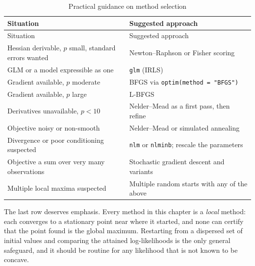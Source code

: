 \documentclass[
  letterpaper,
  DIV=11,
  numbers=noendperiod]{scrreprt}
\newcounter{none} %
\begin{document}
\begin{longtable}[]{@{}
  >{\raggedright\arraybackslash}p{}
  >{\raggedright\arraybackslash}p{}@{}}
\caption{Practical guidance on method
selection}\label{tbl-choosing}\tabularnewline
\toprule\noalign{}
\begin{minipage}[b]{\linewidth}\raggedright
Situation
\end{minipage} & \begin{minipage}[b]{\linewidth}\raggedright
Suggested approach
\end{minipage} \\
\midrule\noalign{}
\endfirsthead
\toprule\noalign{}
\begin{minipage}[b]{\linewidth}\raggedright
Situation
\end{minipage} & \begin{minipage}[b]{\linewidth}\raggedright
Suggested approach
\end{minipage} \\
\midrule\noalign{}
\endhead
\bottomrule\noalign{}
\endlastfoot
Hessian derivable, \(p\) small, standard errors wanted & Newton--Raphson
or Fisher scoring \\
GLM or a model expressible as one & \texttt{glm} (IRLS) \\
Gradient available, \(p\) moderate & BFGS via
\texttt{optim(method\ =\ "BFGS")} \\
Gradient available, \(p\) large & L-BFGS \\
Derivatives unavailable, \(p < 10\) & Nelder--Mead as a first pass, then
refine \\
Objective noisy or non-smooth & Nelder--Mead or simulated annealing \\
Divergence or poor conditioning suspected & \texttt{nlm} or
\texttt{nlminb}; rescale the parameters \\
Objective a sum over very many observations & Stochastic gradient
descent and variants \\
Multiple local maxima suspected & Multiple random starts with any of the
above \\
\end{longtable}

The last row deserves emphasis. Every method in this chapter is a
\emph{local} method: each converges to a stationary point near where it
started, and none can certify that the point found is the global
maximum. Restarting from a dispersed set of initial values and comparing
the attained log-likelihoods is the only general safeguard, and it
should be routine for any likelihood that is not known to be concave.
\end{document}

